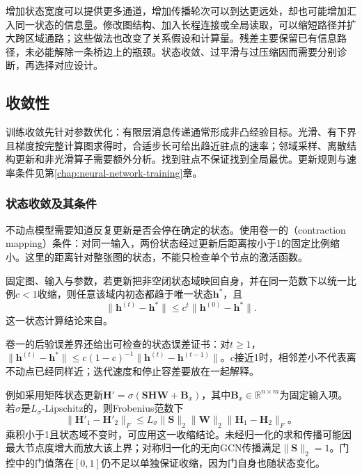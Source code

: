 增加状态宽度可以提供更多通道，增加传播轮次可以到达更远处，却也可能增加汇入同一状态的信息量。修改图结构、加入长程连接或全局读取，可以缩短路径并扩大跨区域通路；这些做法也改变了关系假设和计算量。残差主要保留已有信息路径，未必能解除一条桥边上的瓶颈。状态收敛、过平滑与过压缩因而需要分别诊断，再选择对应设计。

\subsection{收敛性}
\label{sec:gnn-convergence}

训练收敛先针对参数优化：有限层消息传递通常形成非凸经验目标。光滑、有下界且梯度按完整计算图求得时，合适步长可给出趋近驻点的速率；邻域采样、离散结构更新和非光滑算子需要额外分析。找到驻点不保证找到全局最优。更新规则与速率条件见第\ref{chap:neural-network-training}章。

\subsubsection{状态收敛及其条件}
\label{sec:gnn-state-convergence}

不动点模型需要知道反复更新是否会停在确定的状态。使用卷一的（contraction mapping）条件：对同一输入，两份状态经过更新后距离按小于1的固定比例缩小。这里的距离针对整张图的状态，不能只检查单个节点的激活函数。

固定图、输入与参数，若更新把非空闭状态域映回自身，并在同一范数下以统一比例$c<1$收缩，则任意该域内初态都趋于唯一状态$\bm h^*$，且
\begin{equation}
 \lVert\bm h^{(t)}-\bm h^*\rVert\leq c^t\lVert\bm h^{(0)}-\bm h^*\rVert.
 \label{eq:gnn-contraction-error}
\end{equation}
这一状态计算结论来自。

卷一的后验误差界还给出可检查的状态误差证书：对$t\geq1$，$\lVert\bm{h}^{(t)}-\bm{h}^*\rVert\leq c(1-c)^{-1}\lVert\bm{h}^{(t)}-\bm{h}^{(t-1)}\rVert$。$c$接近1时，相邻差小不代表离不动点已经同样近；迭代速度和停止容差要放在一起解释。

例如采用矩阵状态更新$\bm{H}'=\sigma(\bm{S}\bm{H}\bm{W}+\bm{B}_x)$，其中$\bm{B}_x\in\mathbb{R}^{n\times m}$为固定输入项。若$\sigma$是$L_\sigma$-Lipschitz的，则Frobenius范数下
\begin{equation}
  \lVert\bm{H}'_1-\bm{H}'_2\rVert_F
    \leq L_\sigma\lVert\bm{S}\rVert_2\lVert\bm{W}\rVert_2
      \lVert\bm{H}_1-\bm{H}_2\rVert_F\text{。}
  \label{eq:gnn-state-lipschitz}
\end{equation}
乘积小于1且状态域不变时，可应用这一收缩结论。未经归一化的求和传播可能因最大节点度增大而放大该上界；对称归一化的无向GCN传播满足$\lVert\bm{S}\rVert_2=1$。门控中的门值落在$[0,1]$仍不足以单独保证收缩，因为门自身也随状态变化。


